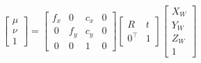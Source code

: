 \begin{equation*}
  \left[\begin{array}{c}\mu\\\nu\\1\end{array}\right]
   = 
  \left[
    \begin{matrix}
      f_x & 0 & c_x & 0 \\\
      0 & f_y & c_y & 0 \\\
      0 & 0 & 1 & 0
    \end{matrix}
  \right]
  \left[
    \begin{array}{cc}R&t\\0^\top&1\end{array}
  \right]
  \left[
    \begin{array}{c}X_W\\Y_W\\Z_W\\1\end{array}
  \right]
\end{equation*}

